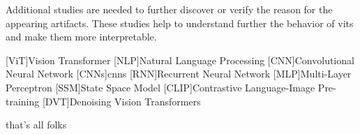\documentclass[conference]{IEEEtran}
\begin{document}
  Additional studies are needed to further discover or verify the reason for the appearing artifacts. These studies help to understand further the behavior of \acp{vit} and make them more interpretable.

  \printbibliography

  \begin{acronym}
    [ViT]{Vision Transformer}
    [NLP]{Natural Language Processing}
    [CNN]{Convolutional Neural Network}
    [CNNs]{\acp{cnn}}
    [RNN]{Recurrent Neural Network}
    [MLP]{Multi-Layer Perceptron}
    [SSM]{State Space Model}
    [CLIP]{Contrastive Language-Image Pre-training}
    [DVT]{Denoising Vision Transformers}
  \end{acronym}


that's all folks
\end{document}
